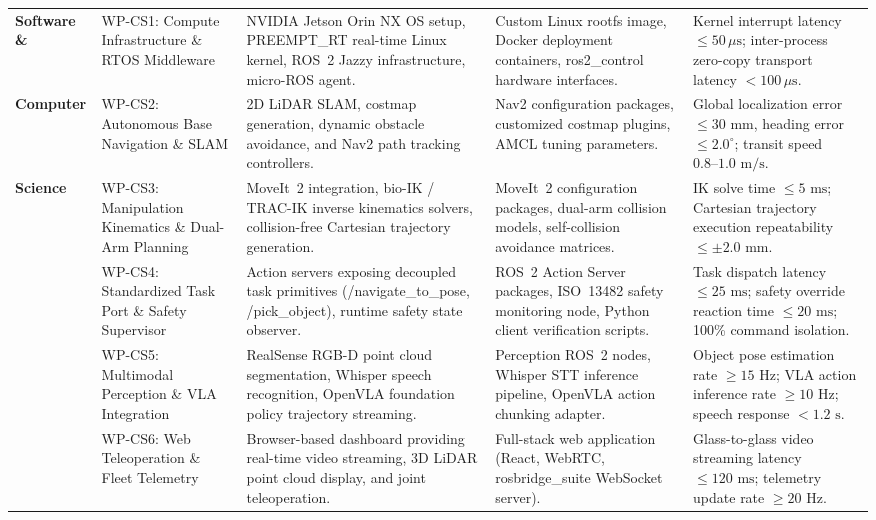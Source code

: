 \begin{small}
\begin{longtable}{@{}p{} p{} p{} p{} p{}@{}}
\textbf{Software \&} & 
WP-CS1: Compute Infrastructure \& RTOS Middleware & 
NVIDIA Jetson Orin NX OS setup, PREEMPT\_RT real-time Linux kernel, ROS~2 Jazzy infrastructure, micro-ROS agent. & 
Custom Linux rootfs image, Docker deployment containers, ros2\_control hardware interfaces. & 
Kernel interrupt latency $\le 50\,\mu\text{s}$; inter-process zero-copy transport latency $<100\,\mu\text{s}$. \\
\addlinespace[3pt]
\textbf{Computer} & 
WP-CS2: Autonomous Base Navigation \& SLAM & 
2D LiDAR SLAM, costmap generation, dynamic obstacle avoidance, and Nav2 path tracking controllers. & 
Nav2 configuration packages, customized costmap plugins, AMCL tuning parameters. & 
Global localization error $\le 30\text{ mm}$, heading error $\le 2.0^\circ$; transit speed $0.8\text{--}1.0\text{ m/s}$. \\
\addlinespace[3pt]
\textbf{Science} & 
WP-CS3: Manipulation Kinematics \& Dual-Arm Planning & 
MoveIt~2 integration, bio-IK / TRAC-IK inverse kinematics solvers, collision-free Cartesian trajectory generation. & 
MoveIt~2 configuration packages, dual-arm collision models, self-collision avoidance matrices. & 
IK solve time $\le 5\text{ ms}$; Cartesian trajectory execution repeatability $\le \pm 2.0\text{ mm}$. \\
\addlinespace[3pt]
& 
WP-CS4: Standardized Task Port \& Safety Supervisor & 
Action servers exposing decoupled task primitives (/navigate\_to\_pose, /pick\_object), runtime safety state observer. & 
ROS~2 Action Server packages, ISO~13482 safety monitoring node, Python client verification scripts. & 
Task dispatch latency $\le 25\text{ ms}$; safety override reaction time $\le 20\text{ ms}$; 100\% command isolation. \\
\addlinespace[3pt]
& 
WP-CS5: Multimodal Perception \& VLA Integration & 
RealSense RGB-D point cloud segmentation, Whisper speech recognition, OpenVLA foundation policy trajectory streaming. & 
Perception ROS~2 nodes, Whisper STT inference pipeline, OpenVLA action chunking adapter. & 
Object pose estimation rate $\ge 15\text{ Hz}$; VLA action inference rate $\ge 10\text{ Hz}$; speech response $<1.2\text{ s}$. \\
\addlinespace[3pt]
& 
WP-CS6: Web Teleoperation \& Fleet Telemetry & 
Browser-based dashboard providing real-time video streaming, 3D LiDAR point cloud display, and joint teleoperation. & 
Full-stack web application (React, WebRTC, rosbridge\_suite WebSocket server). & 
Glass-to-glass video streaming latency $\le 120\text{ ms}$; telemetry update rate $\ge 20\text{ Hz}$. \\
\end{longtable}
\end{small}

